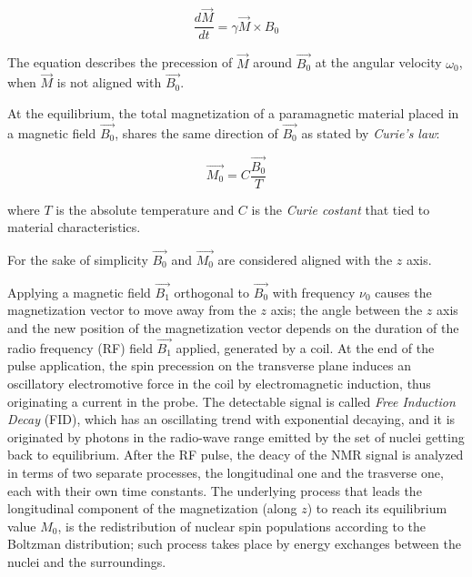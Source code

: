 \documentclass[12pt,openright,twoside,a4paper]{book}
\begin{document}
\begin{equation}
\frac{d\overrightarrow{M}}{dt}=\gamma \overrightarrow{M} \times B_0
\end{equation}

The equation describes the precession of $\overrightarrow{M}$ around $\overrightarrow{B_0}$ at the angular velocity $\omega_0$, when $\overrightarrow{M}$ is not aligned with $\overrightarrow{B_0}$.

At the equilibrium, the total magnetization of a paramagnetic material placed in a magnetic field $\overrightarrow{B_0}$, shares the same direction of $\overrightarrow{B_0}$ as stated by \textit{Curie's law}:

\begin{equation}
\overrightarrow{M_0}=C\frac{\overrightarrow{B_0}}{T}
\end{equation}

where $T$ is the absolute temperature and $C$ is the \textit{Curie costant} that tied to material characteristics.

For the sake of simplicity $\overrightarrow{B_0}$ and $\overrightarrow{M_0}$ are considered aligned with the $z$ axis.
\vspace{5mm}

Applying a magnetic field  $\overrightarrow{B_1}$ orthogonal to  $\overrightarrow{B_0}$ with frequency $\nu_0$ causes the magnetization vector to move away from the $z$ axis; the angle between the $z$ axis and the new position of the magnetization vector depends on the duration of the radio frequency (RF)  field $\overrightarrow{B_1}$ applied, generated by a coil.
At the end of the pulse application, the spin precession on the transverse plane induces an oscillatory electromotive force in the coil by electromagnetic induction, thus originating a current in the probe.
The detectable signal is called \textit{Free Induction Decay} (FID), which has an oscillating trend with exponential decaying, and it is originated by photons in the radio-wave range emitted by the set of nuclei getting back to equilibrium.
After the RF pulse, the deacy of the NMR signal is analyzed in terms of two separate processes, the longitudinal one and the trasverse one, each with their own time constants.
The underlying process that leads the longitudinal component of the magnetization (along $z$) to reach its equilibrium value $M_0$, is the redistribution of nuclear spin populations according to the Boltzman distribution; such process takes place by energy exchanges between the nuclei and the surroundings.
\end{document}
